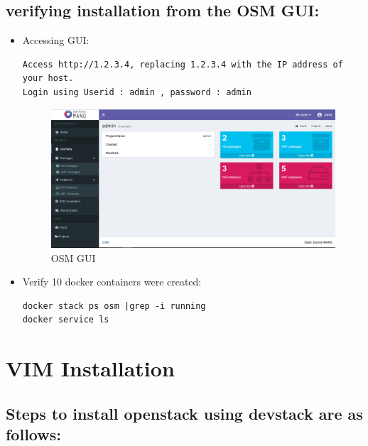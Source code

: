 \subsection{verifying installation from the OSM GUI:}
\begin{itemize}
\item Accessing GUI:
\begin{lstlisting} 
Access http://1.2.3.4, replacing 1.2.3.4 with the IP address of your host.
Login using Userid : admin , password : admin
\end{lstlisting}

\begin{figure} [H]
	\centering
	\includegraphics[width=0.6\linewidth]{figures/Sh1}
	\caption{OSM GUI}
\end{figure}

\item Verify 10 docker containers were created:

\begin{lstlisting} 
docker stack ps osm |grep -i running
docker service ls
\end{lstlisting}

\end{itemize}

\section{VIM Installation}

\subsection{Steps to install openstack using devstack are as follows:}

